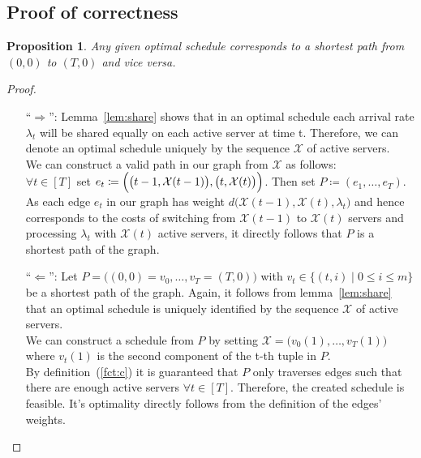 \documentclass[hidelinks]{article}
\theoremstyle{plain}
\newtheorem{prop}[thm]{Proposition}
\theoremstyle{definition}
\theoremstyle{rem}
\begin{document}
\begin{sloppypar}
\subsection{Proof of correctness}
\begin{prop}
Any given optimal schedule corresponds to a shortest path from $(0,0)$ to $(T,0)$ and vice versa.
\end{prop} 
\begin{proof}
$ $
\begin{itemize}
	\item[``$\Rightarrow$'':] Lemma~\ref{lem:share} shows that in an optimal schedule each arrival rate $\lambda_t$ will be shared equally on each active server at time t. Therefore, we can denote an optimal schedule uniquely by the sequence $\mathcal{X}$ of active servers.\\
We can construct a valid path in our graph from $\mathcal{X}$ as follows:\\
$\forall t\in[T]$ set $e_t\coloneqq\Bigl(\bigl(t-1,\mathcal{X}(t-1)\bigr),\bigl(t,\mathcal{X}(t)\bigr)\Bigr)$. Then set $P\coloneqq(e_1,\ldots,e_{T})$.\\
As each edge $e_t$ in our graph has weight $d\bigl(\mathcal{X}(t-1),\mathcal{X}(t),\lambda_{t}\bigr)$ and hence corresponds to the costs of switching from $\mathcal{X}(t-1)$ to $\mathcal{X}(t)$ servers and processing $\lambda_{t}$ with $\mathcal{X}(t)$ active servers, it directly follows that $P$ is a shortest path of the graph.
	\item[``$\Leftarrow$'':] Let $P=\bigl((0,0)=v_0,\ldots,v_T=(T,0)\bigr)$ with $v_t\in\bigl\{(t,i)\mid 0\le i\le m\bigr\}$ be a shortest path of the graph. Again, it follows from lemma~\ref{lem:share} that an optimal schedule is uniquely identified by the sequence $\mathcal{X}$ of active servers.\\
We can construct a schedule from $P$ by setting $\mathcal{X}=\bigl(v_0(1),\ldots,v_T(1)\bigr)$ where $v_t(1)$ is the second component of the t-th tuple in $P$.\\
By definition~(\ref{fct:c}) it is guaranteed that $P$ only traverses edges such that there are enough active servers $\forall t\in[T]$. Therefore, the created schedule is feasible. It's optimality directly follows from the definition of the edges' weights.\\
\end{itemize}
\end{proof}


\end{sloppypar}
\end{document}
